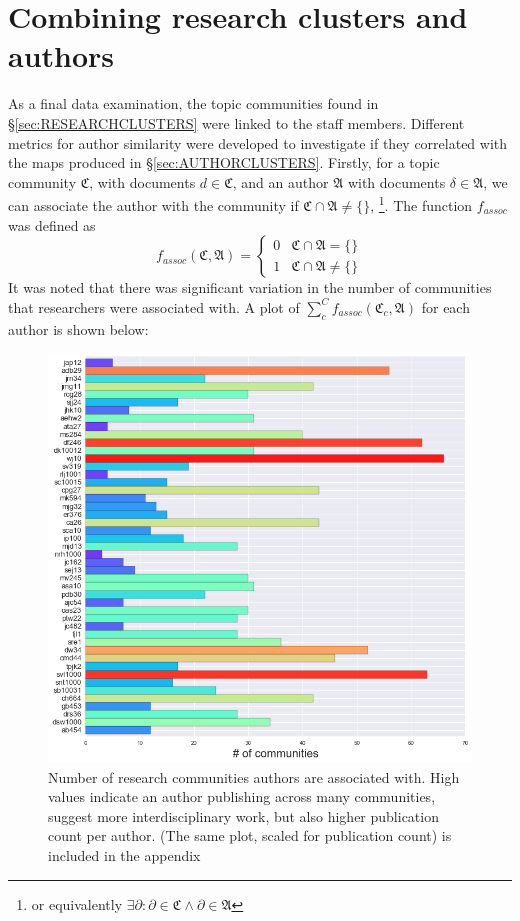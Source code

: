 \section{Combining research clusters and authors}
As a final data examination, the topic communities found in  \S\ref{sec:RESEARCHCLUSTERS} were linked to the staff members. Different metrics for author similarity were developed to investigate if they correlated with the maps produced in \S\ref{sec:AUTHORCLUSTERS}.
Firstly, for a topic community $\mathfrak{C}$, with documents $d \in \mathfrak{C}$, and an author $\mathfrak{A}$ with documents $\delta \in \mathfrak{A}$, we can associate the author with the community if $\mathfrak{C} \cap \mathfrak{A} \neq \{ \}$, \footnote{or equivalently $\exists  \partial : \partial \in \mathfrak{C} \wedge \partial \in \mathfrak{A} $}. The function $f_{assoc}$ was defined as 
\[ 
f_{assoc}\left( \mathfrak{C} , \mathfrak{A} \right) = \begin{cases} 
      0 & \mathfrak{C} \cap \mathfrak{A} = \{ \} \\
      1 & \mathfrak{C} \cap \mathfrak{A} \neq \{ \} 
   \end{cases}
\]
It was noted that there was significant variation in the number of communities that researchers were associated with. A plot of $\sum_c^C f_{assoc} \left( \mathfrak{C}_c , \mathfrak{A} \right)$ for each author is shown below:
\begin{center}
\begin{figure}[H]
  \centering
    \includegraphics[width=\textwidth]{Analysis/community_detection.png}
    \caption{Number of research communities authors are associated with. High values indicate an author publishing across many communities, suggest more interdisciplinary work, but also higher publication count per author. (The same plot, scaled for publication count) is included in the appendix}
\label{fig:commbar}

\end{figure} 
\end{center}
